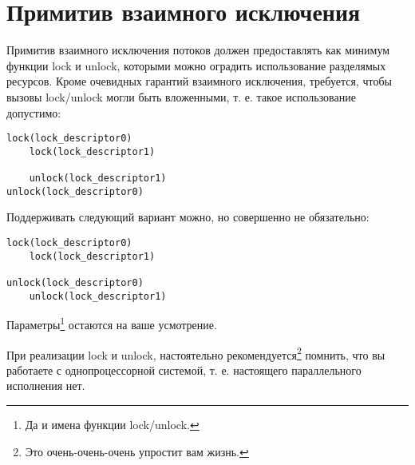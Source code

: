 \section{Примитив взаимного исключения}

Примитив взаимного исключения потоков должен предоставлять как минимум функции
lock и unlock, которыми можно оградить использование разделямых ресурсов. Кроме
очевидных гарантий взаимного исключения, требуется, чтобы вызовы lock/unlock
могли быть вложенными, т. е. такое использование допустимо:

\begin{verbatim}
lock(lock_descriptor0)
    lock(lock_descriptor1)

    unlock(lock_descriptor1)
unlock(lock_descriptor0)
\end{verbatim}

Поддерживать следующий вариант можно, но совершенно не обязательно:

\begin{verbatim}
lock(lock_descriptor0)
    lock(lock_descriptor1)

unlock(lock_descriptor0)
    unlock(lock_descriptor1)
\end{verbatim}

Параметры\footnote{Да и имена функции lock/unlock.} остаются на ваше усмотрение.

При реализации lock и unlock, настоятельно рекомендуется\footnote{Это
очень-очень-очень упростит вам жизнь.} помнить, что вы работаете с
однопроцессорной системой, т. е. настоящего параллельного исполнения нет.
